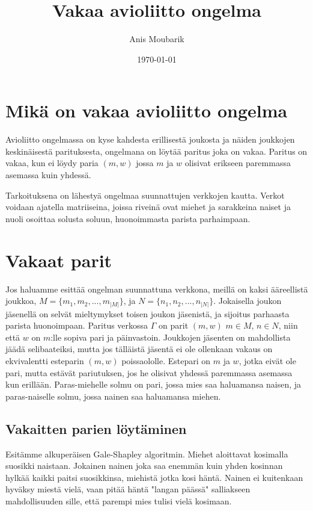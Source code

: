 \documentclass[finnish]{tktltiki2}
\title{Vakaa avioliitto ongelma}
\author{Anis Moubarik}
\date{\today}
\theoremstyle{definition}
\theoremstyle{remark}
\begin{document}

\maketitle        %
\makeabstract     %

\newpage          %



\section{Mikä on vakaa avioliitto ongelma}


Avioliitto ongelmassa on kyse kahdesta erillisestä joukosta ja näiden joukkojen keskinäisestä parituksesta, ongelmana on löytää paritus joka on vakaa. Paritus on vakaa, kun ei löydy paria $(m, w)$ jossa $m$ ja $w$ olisivat erikseen paremmassa asemassa kuin yhdessä.

Tarkoituksena on lähestyä ongelmaa suunnattujen verkkojen kautta. Verkot voidaan ajatella matriiseina, joissa riveinä ovat miehet ja sarakkeina naiset ja nuoli osoittaa solusta soluun, huonoimmasta parista parhaimpaan.


\section{Vakaat parit}
Jos haluamme esittää ongelman suunnattuna verkkona, meillä on kaksi ääreellistä joukkoa, 
$M = \{m_{1}, m_{2},..., m_{|M|}\}$, ja $N = \{n_{1}, n_{2},...,n_{|N|}\}$. Jokaisella joukon jäsenellä on selvät mieltymykset toisen joukon jäsenistä, ja sijoitus parhaasta parista huonoimpaan. Paritus verkossa $\Gamma$ on parit $(m, w)$ $m \in M$, $n \in N$, niin että $w$ on $m$:lle sopiva pari ja päinvastoin. Joukkojen jäsenten on mahdollista jäädä selibaateiksi, mutta jos tälläistä jäsentä ei ole ollenkaan vakaus on ekvivalentti esteparin $(m, w)$ poissaololle.
Estepari on $m$ ja $w$, jotka eivät ole pari, mutta estävät pariutuksen, jos he olisivat yhdessä paremmassa asemassa kun erillään.
Paras-miehelle solmu on pari, jossa mies saa haluamansa naisen, ja paras-naiselle solmu, jossa nainen saa haluamansa miehen.


\subsection{Vakaitten parien löytäminen}
Esitämme alkuperäisen Gale-Shapley algoritmin.
Miehet aloittavat kosimalla suosikki naistaan. Jokainen nainen joka saa enemmän kuin yhden kosinnan hylkää kaikki paitsi suosikkinsa, miehistä jotka kosi häntä. Nainen ei kuitenkaan hyväksy miestä vielä, vaan pitää häntä "langan päässä" salliakseen mahdollisuuden sille, että parempi mies tulisi vielä kosimaan.
\end{document}
